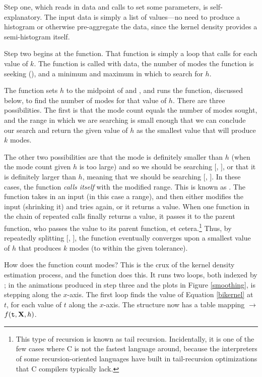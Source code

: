 Step one, which reads in data and calls  to set some
parameters, is self-explanatory. 
The input data is simply
a list of values---no need to produce a histogram or otherwise
pre-aggregate the data, since the kernel density provides a
semi-histogram itself.

Step two begins at the  function. That
function is simply a  loop that calls
 for each value of $k$. The function is
called with data, the number of modes the function is seeking
(), and a minimum and maximum in which to search for $h$.

The function sets $h$ to the midpoint of  and , and
runs the  function, discussed below, to find the number
of modes for that value of $h$. There are three possibilities. The first
is that the mode count equals the number of modes sought, and the range
in which we are searching is small enough that we can conclude our
search and return the given value of $h$ as the smallest value that will
produce $k$ modes. 

The other two possibilities are that the mode is definitely smaller than
$h$ (when the mode count given $h$ is too large) and so we should be
searching $[$, $]$, or that it is definitely larger than
$h$, meaning that we should be searching $[$, $]$. In
these cases, the function {\em calls itself} with the modified range.
This is known as . The function takes in an input (in
this case a range), and then either modifies the input (shrinking it)
and tries again, or it returns a value. When one function in the chain
of repeated calls
finally returns a value, it passes it to the parent function, who passes
the value to its parent function, et cetera.\footnote{This type of
recursion is known as tail recursion. Incidentally, it is one of the few
cases where C is not the fastest language around, because the interpreters
of some recursion-oriented languages have built in tail-recursion
optimizations that C compilers typically lack.} Thus, by repeatedly
splitting $[$, $]$, the function eventually converges
upon a smallest value of $h$ that produces $k$ modes (to within the
given tolerance). 

How does the function count modes? This is the crux of the kernel
density estimation process, and the function  does this.
It runs two loops, both indexed by ; in the animations
produced in step three and the plots in Figure \ref{smoothing}, 
is stepping along the $x$-axis.
The first loop finds the value of Equation \ref{bikernel} at
$t$, for each value of $t$ along the $x$-axis. The  structure
now has a table mapping  $\to$ $f({\bf\tt t}, {\bf X}, h)$.

